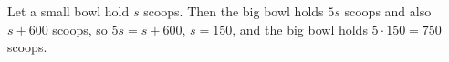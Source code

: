 Let a small bowl hold $s$ scoops. Then the big bowl holds $5s$ scoops and also $s+600$ scoops, so $5s=s+600$, $s=150$, and the big bowl holds $5\cdot150=\boxed{750}$ scoops.
